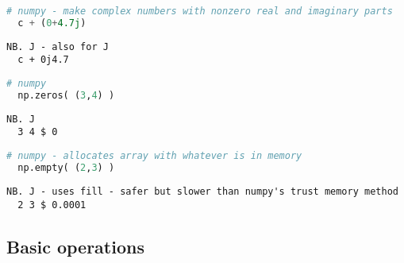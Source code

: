 \begin{tcolorbox}[breakable, size=fbox, boxrule=1pt, pad at break*=1mm,colback=cellbackground, colframe=cellborder]
\begin{lstlisting}[language=python, frame=single, framerule=0pt, basicstyle=\ttfamily\normalsize, keywordstyle=\bfseries\color{keywcolor}\normalsize]
  # numpy - make complex numbers with nonzero real and imaginary parts
  c + (0+4.7j) 
\end{lstlisting}

\begin{lstlisting}[language=jdoc, frame=single, framerule=0pt, basicstyle=\ttfamily\normalsize, keywordstyle=\bfseries\color{keywcolor}\normalsize]   
  NB. J - also for J
  c + 0j4.7
\end{lstlisting}
 
\begin{lstlisting}[language=python, frame=single, framerule=0pt, basicstyle=\ttfamily\normalsize, keywordstyle=\bfseries\color{keywcolor}\normalsize] 
  # numpy 
  np.zeros( (3,4) ) 
\end{lstlisting} 

\begin{lstlisting}[language=jdoc, frame=single, framerule=0pt, basicstyle=\ttfamily\normalsize, keywordstyle=\bfseries\color{keywcolor}\normalsize]  
  NB. J 
  3 4 $ 0  
\end{lstlisting}

\begin{lstlisting}[language=python, frame=single, framerule=0pt, basicstyle=\ttfamily\normalsize, keywordstyle=\bfseries\color{keywcolor}\normalsize] 
  # numpy - allocates array with whatever is in memory 
  np.empty( (2,3) )  
\end{lstlisting}

\begin{lstlisting}[language=jdoc, frame=single, framerule=0pt, basicstyle=\ttfamily\normalsize, keywordstyle=\bfseries\color{keywcolor}\normalsize]   
  NB. J - uses fill - safer but slower than numpy's trust memory method 
  2 3 $ 0.0001 
\end{lstlisting}
\end{tcolorbox}

\subsection*{Basic operations}

